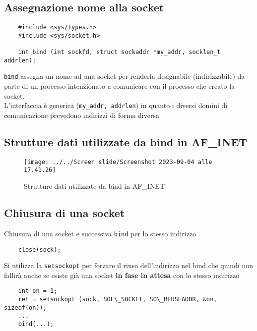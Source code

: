 \documentclass[italian,12pt,a4paper]{article}
\begin{document}
\subsection{Assegnazione nome alla socket}
\begin{verbatim}
	#include <sys/types.h>
	#include <sys/socket.h>
	
	int bind (int sockfd, struct sockaddr *my_addr, socklen_t addrlen);
\end{verbatim}
\verb|bind| assegna un nome ad una socket per renderla designabile (indirizzabile) da parte di un processo intenzionato a comunicare con il processo che creato la socket.\\
L'interfaccia è generica (\verb|my_addr, addrlen|) in quanto i diversi domini di comunicazione prevedono indirizzi di forma diversa
\newpage
\subsection{Strutture dati utilizzate da bind in AF\_INET}
\begin{figure}[h!]
	\centering
	\texttt{[image: ../../Screen slide/Screenshot 2023-09-04 alle 17.41.26]}
	\caption{Strutture dati utilizzate da bind in AF\_INET}
\end{figure}
\subsection{Chiusura di una socket}
Chiusura di una socket e successiva \verb|bind| per lo stesso indirizzo
\begin{verbatim}
	close(sock);
\end{verbatim}
Si utilizza la \verb|setsockopt| per forzare il riuso dell'indirizzo nel bind che quindi non fallirà anche se esiste già una socket \textbf{in fase in attesa} con lo stesso indirizzo
\begin{verbatim}
	int on = 1;
	ret = setsockopt (sock, SOL\_SOCKET, SO\_REUSEADDR, &on, sizeof(on));
	...
	bind(...);
\end{verbatim}
\end{document}
